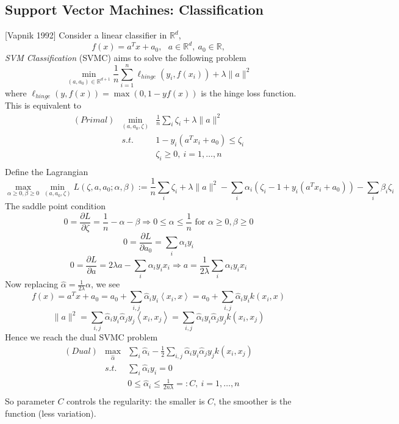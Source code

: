 \documentclass[twoside]{article}
\theoremstyle{definition}
\theoremstyle{definition}
\theoremstyle{remark}
\def\R{{\mathbb R}}
\begin{document}
\subsection{Support Vector Machines: Classification}
[Vapnik 1992] Consider a linear classifier in $\R^d$,
\[ f(x) = a^T x + a_0, \ \ \ a\in \R^d,\ a_0\in \R, \]
\emph{SVM Classification} (SVMC) aims to solve the following problem
\[ \min_{(a,a_0)\in \R^{d+1}} \frac{1}{n} \sum_{i=1}^n \ell_{hinge}(y_i, f(x_i)) + \lambda \|a\|^2 \]
where $\ell_{hinge}(y,f(x))= \max(0, 1-y f(x))$ is the hinge loss function. This is equivalent to 
\begin{eqnarray*}
(Primal) & \min\limits_{(a,a_0,\zeta)} & \frac{1}{n}\sum_i \zeta_i + \lambda \|a\|^2 \\
& s.t. & 1 - y_i (a^T x_i + a_0) \leq \zeta_i \\ 
& & \zeta_i \geq 0,\  i =1,\ldots,n \\
\end{eqnarray*}
Define the Lagrangian
\[ \max\limits_{\alpha\geq 0,\beta\geq 0}\min\limits_{(a,a_0,\zeta)} L(\zeta,a,a_0; \alpha,\beta) :=  \frac{1}{n}\sum_i \zeta_i + \lambda \|a\|^2  - \sum_i \alpha_i (\zeta_i - 1 + y_i(a^T x_i + a_0)) - \sum_i \beta_i \zeta_i \]
The saddle point condition
\[0 = \frac{\partial L}{\partial \zeta} = \frac{1}{n} - \alpha -\beta \Rightarrow 0\leq \alpha\leq \frac{1}{n} \mbox{ for $\alpha\geq 0, \beta\geq 0$}  \]
\[ 0 =\frac{\partial L}{\partial a_0} = \sum_i \alpha_i y_i \]
\[ 0 = \frac{\partial L}{\partial a} = 2 \lambda a - \sum_i \alpha_i y_i x_i  \Rightarrow a = \frac{1}{2\lambda} \sum_i \alpha_i y_i x_i \]
 Now replacing $\hat{\alpha} = \frac{1}{2\lambda} \alpha$, we see
 \[ f(x) = a^T x + a_0 = a_0 + \sum_{i,j} \hat{\alpha}_i y_i \left <x_i, x\right> =  a_0 + \sum_{i,j} \hat{\alpha}_i y_i k(x_i, x) \]
 \[ \|a\|^2 = \sum_{i,j} \hat{\alpha}_i y_i \hat{\alpha}_j y_j \left<x_i,x_j \right> = \sum_{i,j} \hat{\alpha}_i y_i \hat{\alpha}_j y_j k(x_i,x_j) \]
 Hence we reach the dual SVMC problem 
 \begin{eqnarray*}
(Dual) & \max\limits_{\hat{\alpha}} &  \sum_i \hat{\alpha}_i - \frac{1}{2}\sum_{i,j} \hat{\alpha}_i y_i \hat{\alpha}_j y_j k(x_i,x_j)\\
& s.t. & \sum_i \hat{\alpha}_i y_i =0\\ 
& & 0\leq \hat{\alpha}_i \leq \frac{1}{2n\lambda} =: C,\  i =1,\ldots,n \\
\end{eqnarray*}
So parameter $C$ controls the regularity: the smaller is $C$, the smoother is the function (less variation). 
\end{document}
